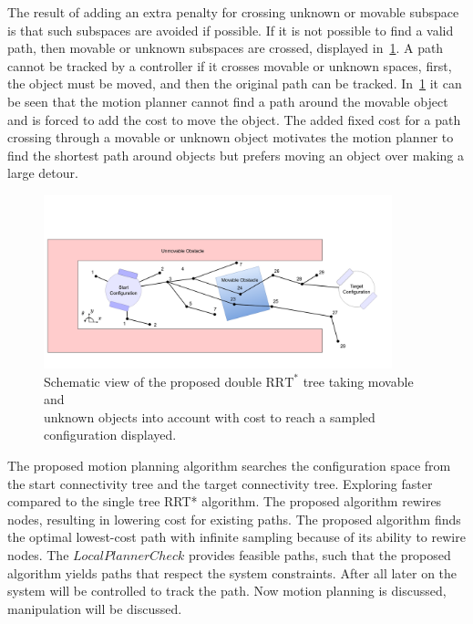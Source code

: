The result of adding an extra penalty for crossing unknown or movable subspace is that such subspaces are avoided if possible. If it is not possible to find a valid path, then movable or unknown subspaces are crossed, displayed in~\cref{fig:double_rrt_alg}. A path cannot be tracked by a controller if it crosses movable or unknown spaces, first, the object must be moved, and then the original path can be tracked. In~\cref{fig:double_rrt_alg} it can be seen that the motion planner cannot find a path around the movable object and is forced to add the cost to move the object. The added fixed cost for a path crossing through a movable or unknown object motivates the motion planner to find the shortest path around objects but prefers moving an object over making a large detour.\bs

\begin{figure}[H]
    \centering
    \includegraphics[width=0.9\textwidth]{figures/rrt_with_costs.png}
    \caption{Schematic view of the proposed double $\text{RRT}^*$ tree taking movable and\\unknown objects into account with cost to reach a sampled configuration displayed.}
    \label{fig:double_rrt_alg}
\end{figure}

The proposed motion planning algorithm searches the configuration space from the start connectivity tree and the target connectivity tree. Exploring faster compared to the single tree \ac{RRT*} algorithm. The proposed algorithm rewires nodes, resulting in lowering cost for existing paths. The proposed algorithm finds the optimal lowest-cost path with infinite sampling because of its ability to rewire nodes. The $LocalPlannerCheck$ provides feasible paths, such that the proposed algorithm yields paths that respect the system constraints. After all later on the system will be controlled to track the path. Now motion planning is discussed, manipulation will be discussed.

